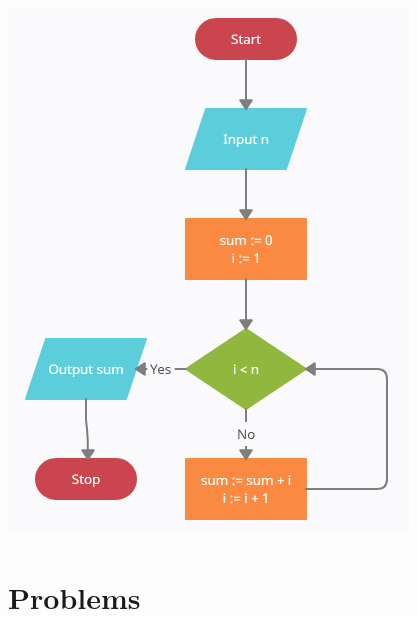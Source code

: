 \documentclass{ximera}
\begin{document}
\begin{center}
	\includegraphics{gausssum.png}
\end{center}

\section{Problems}
\end{document}
